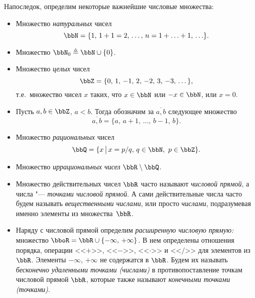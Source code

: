 Напоследок, определим некоторые важнейшие числовые множества:
\begin{itemize}[wide, labelwidth=!, labelindent=0pt, nolistsep, topsep=0pt]
\item 
Множество \textit{натуральных} чисел 
$$\bbN = \{1,\,1+1=2,\,\ldots,\,n = 1+\ldots+1,\,\ldots\}.$$
\item 
Множество $\bbN_0 \triangleq \bbN \cup \{0\}$.
\item 
Множество \textit{целых} чисел 
$$
\bbZ = \{ 0,\,1,\,-1,\,2,\,-2,\,3,\,-3,\,\dots\},
$$ 
т.е.~множество чисел $x$ таких, что $x\in \bbN$ или $-x \in \bbN$, или $x = 0$.
\item Пусть $a,b\in\bbZ$, $a<b$. Тогда обозначим за $\overline{a,b}$ следующее множество
$$
\overline{a,b} = \{a,\,a+1,\,\dots,\,b-1,\,b\}.
$$
\item
Множество \textit{рациональных} чисел 
$$
\bbQ=\{x\,\big|\,x=p/q,\, q\in\bbN,\ p\in\bbZ\}.
$$
\item 
Множество \textit{иррациональных чисел} $\bbR \setminus \bbQ$.
\item 
Множество действительных чисел $\bbR$ часто называют \textit{числовой прямой}, а числа "--- \textit{точками числовой прямой}. А сами действительные числа часто будем называть \textit{вещественными числами}, или просто \textit{числами}, подразумевая именно элементы из множества~$\bbR$.
\item 
Наряду с числовой прямой определим \textit{расширенную числовую прямую:} множество $\bboR=\bbR\cup \{-\infty,\,+\infty\}$. В нем определены отношения порядка, операции  <<$+$>>, <<$-$>>, <<$\cdot$>> и <<$/$>> для элементов из $\bbR$. Элементы $-\infty$, $+\infty$ не содержатся в $\bbR$. Будем их называть \textit{бесконечно удаленными точками (числами)} в противопоставление точкам числовой прямой $\bbR$, которые также называют \textit{конечными точками (точками)}. 


\end{itemize}
